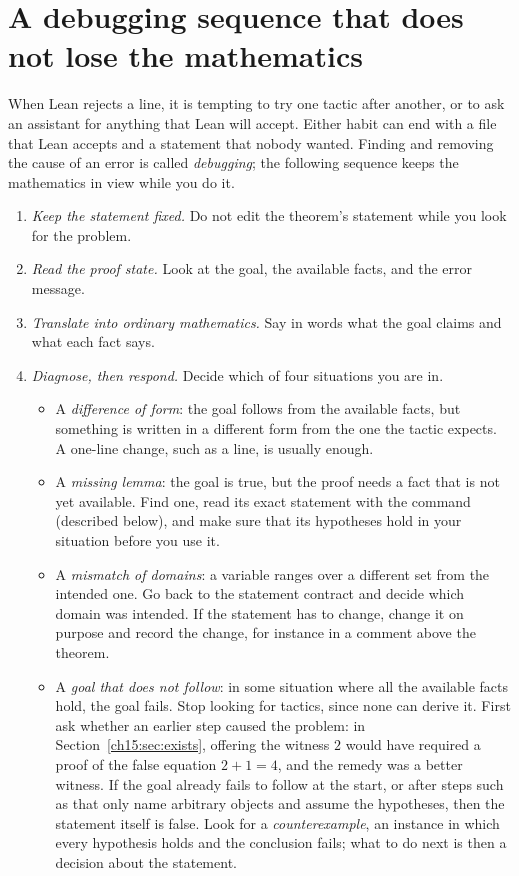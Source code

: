 \section{A debugging sequence that does not lose the mathematics}\label{ch16:sec:debugging}
When Lean rejects a line, it is tempting to try one tactic after another, or to ask an assistant for anything that Lean will accept. Either habit can end with a file that Lean accepts and a statement that nobody wanted. Finding and removing the cause of an error is called \emph{debugging}; the following sequence keeps the mathematics in view while you do it.
\begin{enumerate}
\item \emph{Keep the statement fixed.} Do not edit the theorem's statement while you look for the problem.
\item \emph{Read the proof state.} Look at the goal, the available facts, and the error message.
\item \emph{Translate into ordinary mathematics.} Say in words what the goal claims and what each fact says.
\item \emph{Diagnose, then respond.} Decide which of four situations you are in.
\begin{itemize}
\item A \emph{difference of form}: the goal follows from the available facts, but something is written in a different form from the one the tactic expects. A one-line change, such as a  line, is usually enough.
\item A \emph{missing lemma}: the goal is true, but the proof needs a fact that is not yet available. Find one, read its exact statement with the command  (described below), and make sure that its hypotheses hold in your situation before you use it.
\item A \emph{mismatch of domains}: a variable ranges over a different set from the intended one. Go back to the statement contract and decide which domain was intended. If the statement has to change, change it on purpose and record the change, for instance in a comment above the theorem.
\item A \emph{goal that does not follow}: in some situation where all the available facts hold, the goal fails. Stop looking for tactics, since none can derive it. First ask whether an earlier step caused the problem: in Section~\ref{ch15:sec:exists}, offering the witness $2$ would have required a proof of the false equation $2+1=4$, and the remedy was a better witness. If the goal already fails to follow at the start, or after steps such as  that only name arbitrary objects and assume the hypotheses, then the statement itself is false. Look for a \emph{counterexample}, an instance in which every hypothesis holds and the conclusion fails; what to do next is then a decision about the statement.
\end{itemize}
\end{enumerate}

